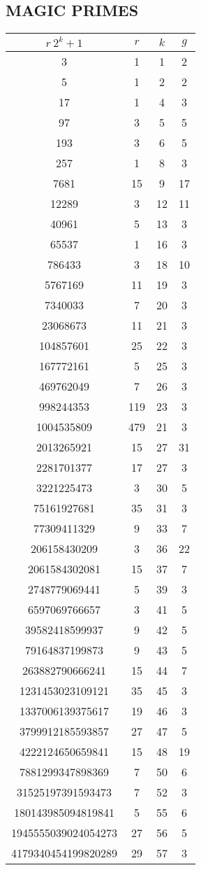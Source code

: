 \subsection{MAGIC PRIMES}
\begin{spacing}{0.9}
\begin{tabular}[ht!]{cccc}
\toprule
$r~2^k+1$&$r$&$k$&$g$\\
\midrule
3&1&1&2\\
5&1&2&2\\
17&1&4&3\\
97&3&5&5\\
193&3&6&5\\
257&1&8&3\\
7681&15&9&17\\
12289&3&12&11\\
40961&5&13&3\\
65537&1&16&3\\
786433&3&18&10\\
5767169&11&19&3\\
7340033&7&20&3\\
23068673&11&21&3\\
104857601&25&22&3\\
167772161&5&25&3\\
469762049&7&26&3\\
998244353&119&23&3\\
1004535809&479&21&3\\
2013265921&15&27&31\\
2281701377&17&27&3\\
3221225473&3&30&5\\
75161927681&35&31&3\\
77309411329&9&33&7\\
206158430209&3&36&22\\
2061584302081&15&37&7\\
2748779069441&5&39&3\\
6597069766657&3&41&5\\
39582418599937&9&42&5\\
79164837199873&9&43&5\\
263882790666241&15&44&7\\
1231453023109121&35&45&3\\
1337006139375617&19&46&3\\
3799912185593857&27&47&5\\
4222124650659841&15&48&19\\
7881299347898369&7&50&6\\
31525197391593473&7&52&3\\
180143985094819841&5&55&6\\
1945555039024054273&27&56&5\\
4179340454199820289&29&57&3\\
\bottomrule
\end{tabular}
\end{spacing}

